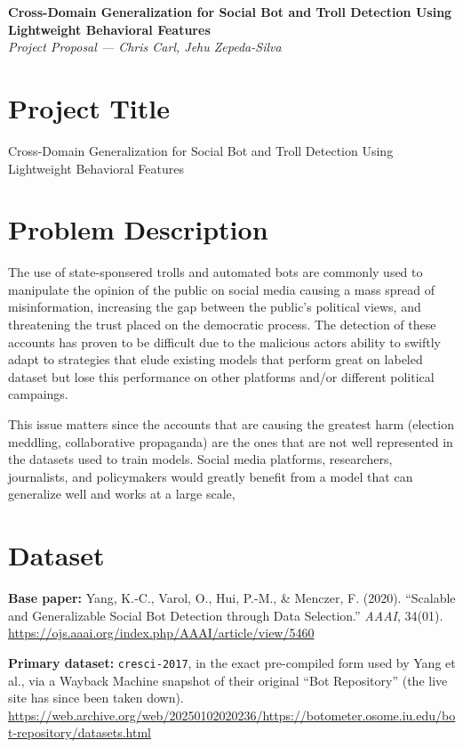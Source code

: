 \documentclass[11pt]{article}
\begin{document}
\begin{center}
{\large\bfseries Cross-Domain Generalization for Social Bot and Troll Detection Using Lightweight Behavioral Features}\\[2pt]
\textit{Project Proposal --- Chris Carl, Jehu Zepeda-Silva}
\end{center}
\vspace{0.4em}

\section{Project Title}
Cross-Domain Generalization for Social Bot and Troll Detection Using Lightweight Behavioral Features

\section{Problem Description}

The use of state-sponsered trolls and automated bots are commonly used to manipulate the opinion of the public on social media causing a mass spread of misinformation, increasing the gap between the public's political views, and threatening the trust placed on the democratic process. The detection of these accounts has proven to be difficult due to the malicious actors ability to swiftly adapt to strategies that elude existing models that perform great on labeled dataset but lose this performance on other platforms and/or different political campaings. 

This issue matters since the accounts that are causing the greatest harm (election meddling, collaborative propaganda) are the ones that are not well represented in the datasets used to train models. Social media platforms, researchers, journalists, and policymakers would greatly benefit from a model that can generalize well and works at a large scale,


\section{Dataset}

\textbf{Base paper:} Yang, K.-C., Varol, O., Hui, P.-M., \& Menczer, F. (2020). ``Scalable and Generalizable Social Bot Detection through Data Selection.'' \emph{AAAI}, 34(01). \url{https://ojs.aaai.org/index.php/AAAI/article/view/5460}

\textbf{Primary dataset:} \texttt{cresci-2017}, in the exact pre-compiled form used by Yang et al., via a Wayback Machine snapshot of their original ``Bot Repository'' (the live site has since been taken down). \url{https://web.archive.org/web/20250102020236/https://botometer.osome.iu.edu/bot-repository/datasets.html}
\end{document}
